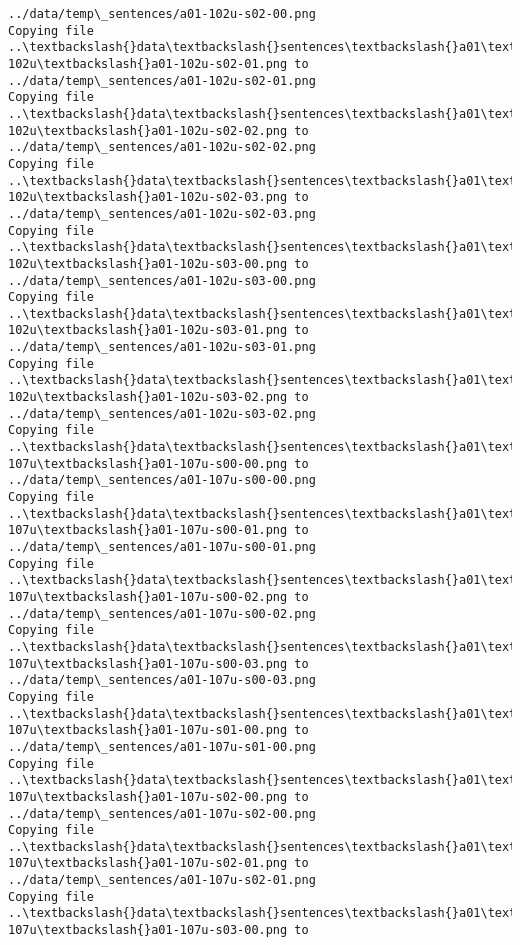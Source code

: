 \documentclass[11pt]{article}
\begin{document}
\begin{Verbatim}[commandchars=\\\{\}]
../data/temp\_sentences/a01-102u-s02-00.png
Copying file ..\textbackslash{}data\textbackslash{}sentences\textbackslash{}a01\textbackslash{}a01-102u\textbackslash{}a01-102u-s02-01.png to
../data/temp\_sentences/a01-102u-s02-01.png
Copying file ..\textbackslash{}data\textbackslash{}sentences\textbackslash{}a01\textbackslash{}a01-102u\textbackslash{}a01-102u-s02-02.png to
../data/temp\_sentences/a01-102u-s02-02.png
Copying file ..\textbackslash{}data\textbackslash{}sentences\textbackslash{}a01\textbackslash{}a01-102u\textbackslash{}a01-102u-s02-03.png to
../data/temp\_sentences/a01-102u-s02-03.png
Copying file ..\textbackslash{}data\textbackslash{}sentences\textbackslash{}a01\textbackslash{}a01-102u\textbackslash{}a01-102u-s03-00.png to
../data/temp\_sentences/a01-102u-s03-00.png
Copying file ..\textbackslash{}data\textbackslash{}sentences\textbackslash{}a01\textbackslash{}a01-102u\textbackslash{}a01-102u-s03-01.png to
../data/temp\_sentences/a01-102u-s03-01.png
Copying file ..\textbackslash{}data\textbackslash{}sentences\textbackslash{}a01\textbackslash{}a01-102u\textbackslash{}a01-102u-s03-02.png to
../data/temp\_sentences/a01-102u-s03-02.png
Copying file ..\textbackslash{}data\textbackslash{}sentences\textbackslash{}a01\textbackslash{}a01-107u\textbackslash{}a01-107u-s00-00.png to
../data/temp\_sentences/a01-107u-s00-00.png
Copying file ..\textbackslash{}data\textbackslash{}sentences\textbackslash{}a01\textbackslash{}a01-107u\textbackslash{}a01-107u-s00-01.png to
../data/temp\_sentences/a01-107u-s00-01.png
Copying file ..\textbackslash{}data\textbackslash{}sentences\textbackslash{}a01\textbackslash{}a01-107u\textbackslash{}a01-107u-s00-02.png to
../data/temp\_sentences/a01-107u-s00-02.png
Copying file ..\textbackslash{}data\textbackslash{}sentences\textbackslash{}a01\textbackslash{}a01-107u\textbackslash{}a01-107u-s00-03.png to
../data/temp\_sentences/a01-107u-s00-03.png
Copying file ..\textbackslash{}data\textbackslash{}sentences\textbackslash{}a01\textbackslash{}a01-107u\textbackslash{}a01-107u-s01-00.png to
../data/temp\_sentences/a01-107u-s01-00.png
Copying file ..\textbackslash{}data\textbackslash{}sentences\textbackslash{}a01\textbackslash{}a01-107u\textbackslash{}a01-107u-s02-00.png to
../data/temp\_sentences/a01-107u-s02-00.png
Copying file ..\textbackslash{}data\textbackslash{}sentences\textbackslash{}a01\textbackslash{}a01-107u\textbackslash{}a01-107u-s02-01.png to
../data/temp\_sentences/a01-107u-s02-01.png
Copying file ..\textbackslash{}data\textbackslash{}sentences\textbackslash{}a01\textbackslash{}a01-107u\textbackslash{}a01-107u-s03-00.png to

\end{Verbatim}
\end{document}
